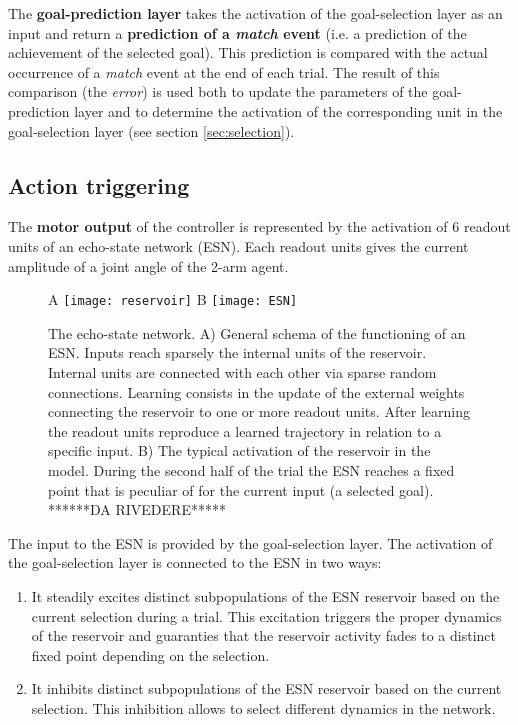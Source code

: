 \documentclass[11pt]{article}
\begin{document}
The \textbf{goal-prediction layer} takes the activation of the goal-selection
layer as an input and return a \textbf{prediction of a \emph{match} event} (i.e. a prediction of the achievement of the selected goal).
This prediction is compared with the actual occurrence of a \emph{match} event
at the end of each trial. The result of this comparison (the \emph{error}) is used
both to update the parameters of the goal-prediction layer and to determine the
activation of the corresponding unit in the goal-selection layer (see section \ref{sec:selection}).


\subsection{Action triggering}
\label{sec:actiontriggering}

The \textbf{motor output} of the controller is represented by the
activation of 6 readout units of an echo-state network (ESN). Each readout
units gives the current amplitude of a joint angle of the 2-arm agent. 
%
\begin{figure}[H]
    \centering
    A \texttt{[image: reservoir]}
    B \texttt{[image: ESN]}
    \caption{
        The echo-state network. A) General schema of the functioning of an ESN.
        Inputs reach sparsely the internal units of the reservoir.  Internal
        units are connected with each other via sparse random connections.
        Learning consists in the update of the external weights connecting the
        reservoir to one or more readout units. After learning the readout units
        reproduce a learned trajectory in relation to a specific input.
        B) The typical activation of the reservoir in the model. During the second 
        half of the trial the ESN reaches a fixed point that is peculiar of for 
        the current input (a selected goal).
        ******DA RIVEDERE*****
    }
    \label{fig:esn}
\end{figure}
%
The input to the ESN is provided by the goal-selection layer. The activation of
the goal-selection layer is connected to the ESN in two ways: 

\begin{enumerate}

    \item It steadily excites distinct subpopulations of the ESN
        reservoir based on the current selection during a trial. This
        excitation triggers the proper dynamics of the reservoir and
        guaranties that the reservoir activity fades to a distinct fixed
        point depending on the selection.

    \item It inhibits distinct subpopulations of the ESN reservoir based on
        the current selection. This inhibition allows to select different
        dynamics in the network.

\end{enumerate}
\end{document}
